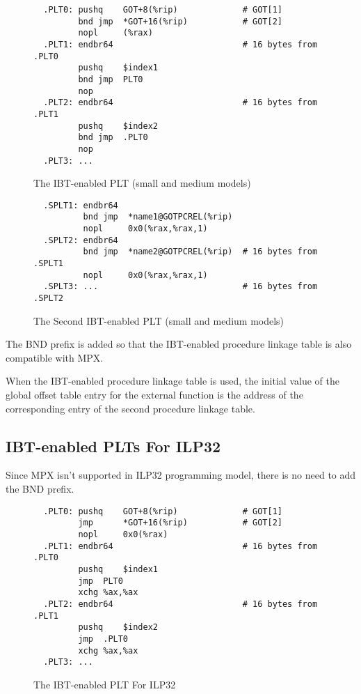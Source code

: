 \begin{figure}[H]
\Hrule
\caption{The IBT-enabled PLT (small and medium models)}
\label{ibt_small_med_plt}
\begin{footnotesize}
\begin{verbatim}
  .PLT0: pushq    GOT+8(%rip)             # GOT[1]
         bnd jmp  *GOT+16(%rip)           # GOT[2]
         nopl     (%rax)
  .PLT1: endbr64                          # 16 bytes from .PLT0
         pushq    $index1
         bnd jmp  PLT0
         nop
  .PLT2: endbr64                          # 16 bytes from .PLT1
         pushq    $index2
         bnd jmp  .PLT0
         nop
  .PLT3: ...
\end{verbatim}%
\end{footnotesize}
\Hrule
\end{figure}

\begin{figure}[H]
\Hrule
\caption{The Second IBT-enabled PLT (small and medium models)}
\label{ibt_sec_small_med_plt}
\begin{footnotesize}
\begin{verbatim}
  .SPLT1: endbr64
          bnd jmp  *name1@GOTPCREL(%rip)
          nopl     0x0(%rax,%rax,1)
  .SPLT2: endbr64
          bnd jmp  *name2@GOTPCREL(%rip)  # 16 bytes from .SPLT1
          nopl     0x0(%rax,%rax,1)
  .SPLT3: ...                             # 16 bytes from .SPLT2
\end{verbatim}%
\end{footnotesize}
\Hrule
\end{figure}

The BND prefix is added so that the IBT-enabled procedure linkage table is
also compatible with MPX.

When the IBT-enabled procedure linkage table is used, the initial value of
the global offset table entry for the external function is the address of
the corresponding entry of the second procedure linkage table.

\subsection{IBT-enabled PLTs For ILP32}

Since MPX isn't supported in ILP32 programming model, there is no
need to add the BND prefix.

\begin{figure}[H]
\Hrule
\caption{The IBT-enabled PLT For ILP32}
\label{ibt_small_med_plt_ipl32}
\begin{footnotesize}
\begin{verbatim}
  .PLT0: pushq    GOT+8(%rip)             # GOT[1]
         jmp      *GOT+16(%rip)           # GOT[2]
         nopl     0x0(%rax)
  .PLT1: endbr64                          # 16 bytes from .PLT0
         pushq    $index1
         jmp  PLT0
         xchg %ax,%ax
  .PLT2: endbr64                          # 16 bytes from .PLT1
         pushq    $index2
         jmp  .PLT0
         xchg %ax,%ax
  .PLT3: ...
\end{verbatim}%
\end{footnotesize}
\Hrule
\end{figure}

